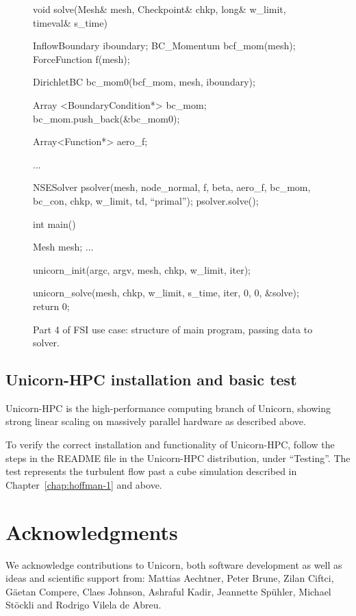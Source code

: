 \begin{figure}
\begin{c++}
void solve(Mesh& mesh, Checkpoint& chkp,
  long& w_limit, timeval& s_time)
{
  InflowBoundary iboundary;
  BC_Momentum bcf_mom(mesh);
  ForceFunction f(mesh);

  DirichletBC bc_mom0(bcf_mom, mesh, iboundary);

  Array <BoundaryCondition*> bc_mom;
  bc_mom.push_back(&bc_mom0);

  Array<Function*> aero_f;

  ...

  NSESolver psolver(mesh, node_normal, f, beta, aero_f, bc_mom, bc_con,
    chkp, w_limit, td, ``primal'');
  psolver.solve();
}

int main()
{
  Mesh mesh;
  ...

  unicorn_init(argc, argv, mesh, chkp, w_limit, iter);

  unicorn_solve(mesh, chkp, w_limit, s_time, iter, 0, 0, &solve);
  return 0;
}
\end{c++}
\caption{Part 4 of FSI use case: structure of main program, passing data to solver.}
\label{code:UseCasePart4}
\end{figure}

\subsection{Unicorn-HPC installation and basic test}

Unicorn-HPC is the high-performance computing branch of Unicorn,
showing strong linear scaling on massively parallel hardware as
described above.

To verify the correct installation and functionality of Unicorn-HPC,
follow the steps in the README file in the Unicorn-HPC distribution,
under ``Testing''. The test represents the turbulent flow past a cube
simulation described in Chapter~\ref{chap:hoffman-1} and above.

\section{Acknowledgments}

We acknowledge contributions to Unicorn, both software development as
well as ideas and scientific support from: Mattias Aechtner, Peter
Brune, Zilan Ciftci, G\"aetan Compere, Claes Johnson, Ashraful Kadir,
Jeannette Sp\"uhler, Michael St\"ockli and Rodrigo Vilela de Abreu.
